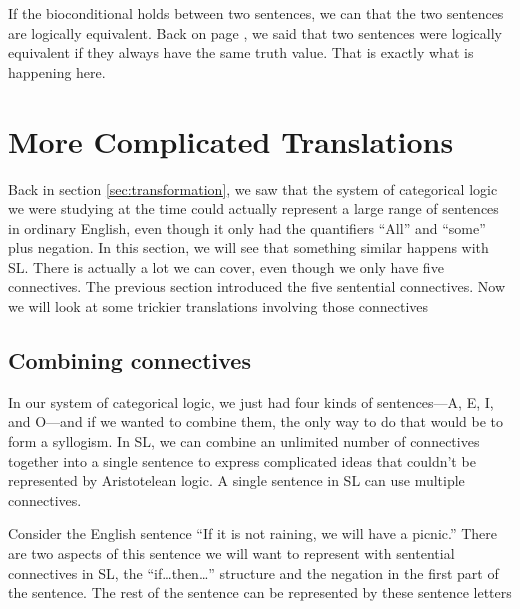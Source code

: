 If the bioconditional holds between two sentences, we can that the two sentences are logically equivalent. Back on page \pageref{def:logical_equivalence}, we said that two sentences were logically equivalent if they always  have the same truth value. That is exactly what is happening here.



\section{More Complicated Translations}

{Back in section \ref{sec:transformation}, we saw that the system of categorical logic we were studying at the time could actually represent a large range of sentences in ordinary English, even though it only had the quantifiers ``All'' and ``some'' plus negation. In this section, we will see that something similar happens with SL. There is actually a lot we can cover, even though we only have five connectives. }%
{The previous section introduced the five sentential connectives. Now we will look at some trickier translations involving those connectives}%


\subsection{Combining connectives}

{In our system of categorical logic, we just had four kinds of sentences---A, E, I, and O---and if we wanted to combine them, the only way to do that would be to form a syllogism. In SL, we can combine an unlimited number of connectives together into a single sentence to express complicated ideas that couldn't be represented by Aristotelean logic. }%
{A single sentence in SL can use multiple connectives.} %

Consider the English sentence ``If it is not raining, we will have a picnic.'' There are two aspects of this sentence we will want to represent with sentential connectives in SL, the ``if\ldots then\ldots'' structure and the negation in the first part of the sentence. The rest of the sentence can be represented by these sentence letters

